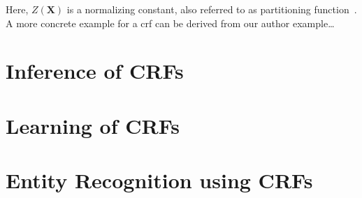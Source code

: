 Here, $Z(\bm{X})$ is a normalizing constant, also referred to as partitioning function~\citep{koller2009probabilistic}.\\

A more concrete example for a \gls{crf} can be derived from our author example\dots


\section{Inference of CRFs}\label{sec:inference-crfs}


\section{Learning of CRFs}\label{sec:learning-crfs}


\section{Entity Recognition using CRFs}\label{sec:er-using-crfs}

